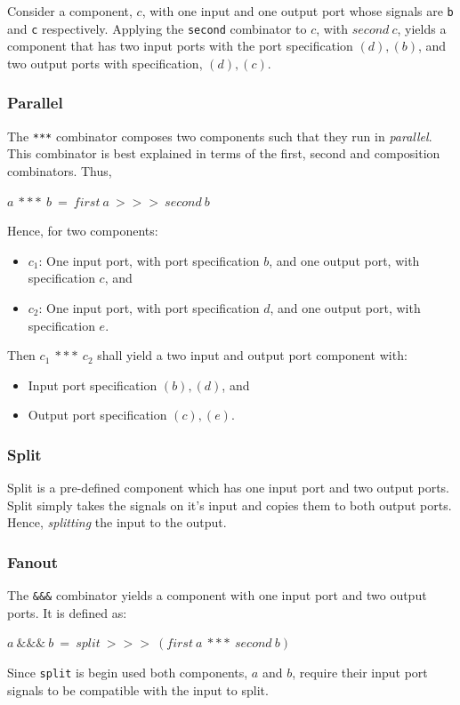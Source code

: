 Consider a component, $c$, with one input and one output port whose signals are \texttt{b} and \texttt{c} respectively. Applying the \texttt{second} combinator to $c$, with $second\ c$, yields a component that has two input ports with the port specification $(d), (b)$, and two output ports with specification, $(d), (c)$.

\subsubsection{Parallel}
The \texttt{***} combinator composes two components such that they run in \emph{parallel}. This combinator is best explained in terms of the first, second and composition combinators. Thus,
\begin{center}
$a\ ***\ b\ =\ first\ a\ >>>\ second\ b$
\end{center}
Hence, for two components:
\begin{itemize}
\item $c_1$: One input port, with port specification $b$, and one output port, with specification $c$, and
\item $c_2$: One input port, with port specification $d$, and one output port, with specification $e$.
\end{itemize}
Then $c_1\ ***\ c_2$ shall yield a two input and output port component with:
\begin{itemize}
\item Input port specification $(b), (d)$, and
\item Output port specification $(c), (e)$.
\end{itemize}

\subsubsection{Split}
Split is a pre-defined component which has one input port and two output ports. Split simply takes the signals on it's input and copies them to both output ports. Hence, \emph{splitting} the input to the output.

\subsubsection{Fanout}
The \texttt{\&\&\&} combinator yields a component with one input port and two output ports. It is defined as:
\begin{center}
$a\ \&\&\&\ b\ =\ split\ >>>\ (first\ a\ ***\ second\ b)$
\end{center}
Since \texttt{split} is begin used both components, $a$ and $b$, require their input port signals to be compatible with the input to split.

